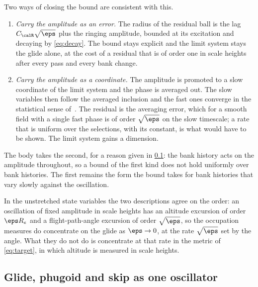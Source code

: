Two ways of closing the bound are consistent with this.
\begin{enumerate}[leftmargin=*,itemsep=2pt]
  \item \emph{Carry the amplitude as an error.} The radius of the residual
    ball is the lag $C_{\calR}\sqrt{\eps}$ plus the ringing amplitude,
    bounded at its excitation and decaying by \cref{eq:decay}. The bound
    stays explicit and the limit system stays the glide alone, at the cost
    of a residual that is of order one in scale heights after every pass
    and every bank change.
  \item \emph{Carry the amplitude as a coordinate.} The amplitude is
    promoted to a slow coordinate of the limit system and the phase is
    averaged out. The slow variables then follow the averaged inclusion and
    the fast ones converge in the statistical sense
    of~\cite{artstein1999invariant}. The residual is the averaging error,
    which for a smooth field with a single fast phase is of order
    $\sqrt{\eps}$ on the slow timescale; a rate that is uniform over the
    selections, with its constant, is what would have to be shown. The
    limit system gains a dimension.
\end{enumerate}
The body takes the second, for a reason given in
\cref{sec:residual-oscillator}: the bank history acts on the amplitude
throughout, so a bound of the first kind does not hold uniformly over bank
histories. The first remains the form the bound takes for bank histories
that vary slowly against the oscillation.

In the unstretched state variables the two descriptions agree on the
order: an oscillation of fixed amplitude in scale heights has an altitude
excursion of order $\eps R_e$ and a flight-path-angle excursion of order
$\sqrt{\eps}$, so the occupation measures do concentrate on the glide as
$\eps\to 0$, at the rate $\sqrt{\eps}$ set by the angle. What they do not
do is concentrate at that rate in the metric of \cref{eq:target}, in which
altitude is measured in scale heights.

\subsection{Glide, phugoid and skip as one oscillator}
\label{sec:residual-oscillator}

